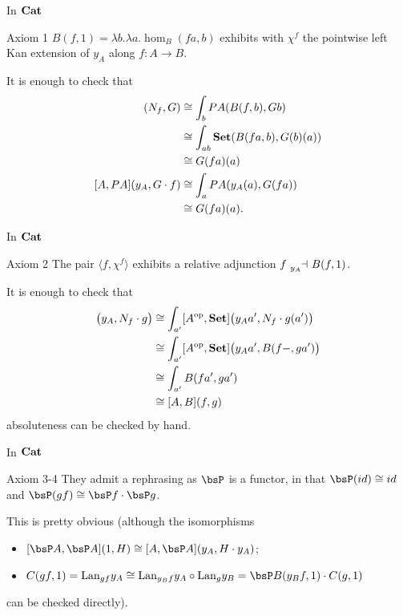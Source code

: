 \documentclass{beamer}
\begin{document}
\begin{frame}{In $\mathbf{Cat}$}
	\begin{block}{Axiom 1}
		$B(f,1) = \lambda b.\lambda a.\hom_B(fa,b)$ exhibits with $\chi^f$ the pointwise left Kan extension of $y_A$ along $f : A \to B$.
	\end{block}
	\pause
	It is enough to check that
	\begin{align*}
		[B,PA](N_f,G)       & \cong \int_b PA(B(f,b),Gb)             \\
		                    & \cong \int_{ab} \Set(B(fa,b), G(b)(a)) \\
		                    & \cong G(fa)(a)                         \\
		[A,PA](y_A,G\crc f) & \cong \int_a PA(y_A(a), G(fa))         \\
		                    & \cong G(fa)(a).
	\end{align*}
\end{frame}
\begin{frame}{In $\mathbf{Cat}$}
	\begin{block}{Axiom 2}
		The pair $\langle f, \chi^f\rangle$ exhibits a relative adjunction $f\reladjL{y_A} B(f,1)$.
	\end{block}
	\pause
	It is enough to check that
	\begin{align*}
		[A,PA]\big( y_A, N_f\crc g \big) & \cong \int_{a'}[A^\op,\Set]\big(y_A{a'}, N_f\crc g(a')\big) \\
		                                 & \cong \int_{a'}[A^\op,\Set]\big( y_A{a'}, B(f - ,ga')\big)  \\
		                                 & \cong \int_{a'}B(fa',ga')                                   \\ &\cong [A,B](f,g)
	\end{align*}
	absoluteness can be checked by hand.
\end{frame}
\begin{frame}{In $\mathbf{Cat}$}
	\begin{block}{Axiom 3-4}
		They admit a rephrasing as $\bsP$ is a functor, in that $\bsP(id)\cong id$ and $\bsP(gf)\cong \bsP f\crc\bsP g$.
	\end{block}
	\pause
	\bigskip
	This is pretty obvious (although the isomorphisms
	\medskip
	\begin{itemize}
		\item[3)] $[\bsP A,\bsP A](1, H)\cong [A,\bsP A](y_A,H\crc y_A)$;
		\item[4)] $C(gf,1)=\Lan_{gf}y_A \cong \Lan_{y_B f}y_A \circ \Lan_g y_B = \bsP B(y_Bf,1)\crc C(g,1)$
	\end{itemize}
	\medskip
	can be checked directly).
\end{frame}
\end{document}
